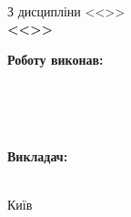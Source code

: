 \begin{titlepage}
    \vspace{\fill}
    
    \begin{center}
        \begin{spacing}{1.5}
            \textbf{\huge{\ReportPreamble}} \\
            \vspace{1cm}З дисципліни <<\ReportSubject>> \\
            \vspace{1cm}\textbf{\Large{<<\ReportName>>}} 
        \end{spacing}
    \end{center}

    \vspace{\fill}

    \newlength{\maxname}
    \settowidth{\maxname}{\small{\TheLongestLabel}}

    \hfill\parbox{\maxname}{
        \begin{spacing}{1.1}
            \small{\textbf{Роботу виконав:}} \\ 
            \small{\AuthorInfo} \\
            \small{\AuthorName} \\
        \end{spacing}
    } \\

    \hfill\parbox{\maxname}{
        \begin{spacing}{1.1}
            \small{\textbf{Викладач:}} \\ 
            \small{\SupervisorName} \\
        \end{spacing}
    }

    \vspace{1cm}
    
    \begin{center}
        \small{Київ \the\year}
    \end{center}
    
\end{titlepage}